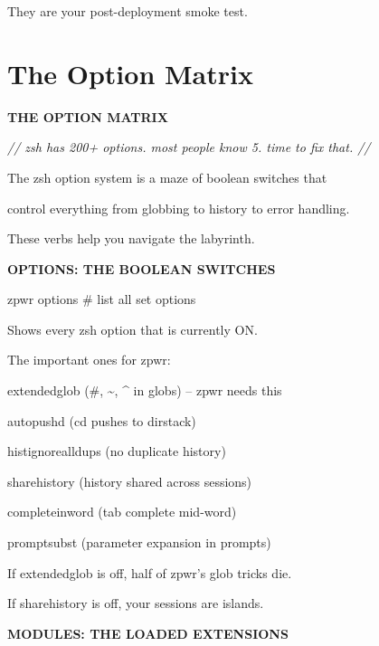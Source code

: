 \documentclass[11pt,a4paper,twoside]{book}
\begin{document}
They are your post-deployment smoke test.


\vspace{16pt}

\section{The Option Matrix}


\vspace{10pt}
{\large\bfseries\color{neoncyan} THE OPTION MATRIX}\vspace{6pt}

{\small\itshape\color{dimtext} // zsh has 200+ options. most people know 5. time to fix that. //}

The zsh option system is a maze of boolean switches that

control everything from globbing to history to error handling.

These verbs help you navigate the labyrinth.


\vspace{12pt}
{\bfseries\color{neonyellow} OPTIONS: THE BOOLEAN SWITCHES}\vspace{4pt}

\begin{codebox}
zpwr options                        \# list all set options\\
\end{codebox}

Shows every zsh option that is currently ON.

The important ones for zpwr:

extendedglob      (\#, \textasciitilde{}, \textasciicircum{} in globs)  -- zpwr needs this

autopushd         (cd pushes to dirstack)

histignorealldups (no duplicate history)

sharehistory      (history shared across sessions)

completeinword    (tab complete mid-word)

promptsubst       (parameter expansion in prompts)

If extendedglob is off, half of zpwr's glob tricks die.

If sharehistory is off, your sessions are islands.


\vspace{12pt}
{\bfseries\color{neonyellow} MODULES: THE LOADED EXTENSIONS}\vspace{4pt}
\end{document}
